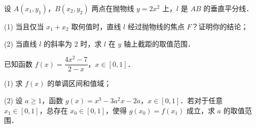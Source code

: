 \begin{question}
设 $A(x_1, y_1)$，$B(x_2, y_2)$ 两点在抛物线 $y = 2x^2$ 上，$l$ 是 $AB$ 的垂直平分线．

(1) 当且仅当 $x_1 + x_2$ 取何值时，直线 $l$ 经过抛物线的焦点 $F$？证明你的结论；

(2) 当直线 $l$ 的斜率为 $2$ 时，求 $l$ 在 $y$ 轴上截距的取值范围．

\end{question}
\begin{question}
已知函数 $f(x) = \dfrac{4x^2 - 7}{2 - x}$，$x \in [0, 1]$．

(1) 求 $f(x)$ 的单调区间和值域；

(2) 设 $a \geqslant 1$，函数 $g(x) = x^3 - 3a^2x - 2a$，$x \in [0, 1]$．若对于任意 $x_1 \in [0, 1]$，总存在 $x_0 \in [0, 1]$，使得 $g(x_0) = f(x_1)$ 成立，求 $a$ 的取值范围．

\end{question}
